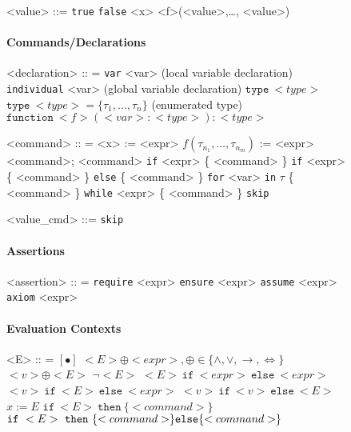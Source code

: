 \documentclass{article}
\begin{document}
\begin{multicols}{2}
\begin{figure*}
\begin{multicols}{4}
\begin{grammar}
                <value> ::= \texttt{true}
                \alt \texttt{false}
                \alt <x>
                \alt <f>(<value>,\dots, <value>)
            \end{grammar}

            \paragraph*{\scriptsize Commands/Declarations}
            \begin{grammar}
                \scriptsize

                <declaration> :: = \texttt{var} <var> (local variable declaration)
                \alt \texttt{individual} <var> (global variable declaration)
                \alt $\texttt{type}~ <type>$
                \alt $\texttt{type}~ <type> = \{ \tau_1, \dots, \tau_n\}$ (enumerated type)
                \alt $\texttt{function}~ <f> (<var>:<type>) : <type>$

                <command> :: = <x> := <expr>
                \alt $f(\tau_{n_1}, \dots, \tau_{n_m})$ := <expr>
                \alt <command>; <command>
                \alt \texttt{if} <expr> \{ <command> \}
                \alt \texttt{if} <expr> \{ <command> \} \texttt{else} \{ <command> \}
                \alt \texttt{for} <var> \texttt{in} $\tau$ \{ <command> \}
                \alt \texttt{while} <expr> \{ <command> \}
                \alt \texttt{skip}

                <value_cmd> ::= \texttt{skip}
            \end{grammar}
            \paragraph*{\scriptsize Assertions}
            \begin{grammar}
                \scriptsize
                <assertion> :: = \texttt{require} <expr>
                \alt \texttt{ensure} <expr>
                \alt \texttt{assume} <expr>
                \alt \texttt{axiom} <expr>
            \end{grammar}
            \paragraph*{\scriptsize Evaluation Contexts}
            \begin{grammar}
                \scriptsize
                <E> :: = $[\bullet]$
                \alt $<E> \oplus <expr>, \oplus \in \{\land, \lor, \to, \Leftrightarrow\}$
                \alt $<v> \oplus <E>$
                \alt $\neg <E>$
                \alt $<E>~\texttt{if} ~ <expr>~  \texttt{else} ~ <expr>$
                \alt $<v>~\texttt{if} ~ <E> ~ \texttt{else}~  <expr>$
                \alt $<v>~\texttt{if} ~ <v> ~ \texttt{else}~  <E>$
                \alt $x := E$
                \alt $\texttt{if} ~ <E> ~\texttt{then}~\{ <command> \} $
                \alt $\texttt{if} ~ <E> ~\texttt{then}~\{ <command> \}  \\ \texttt{else} \{ <command> \}$


\end{grammar}
\end{multicols}
\end{figure*}
\end{multicols}
\end{document}
